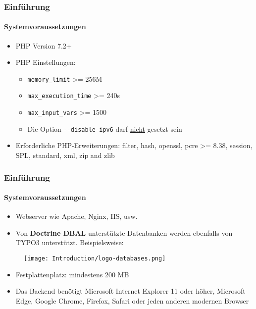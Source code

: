 \begin{frame}[fragile]
	\frametitle{Einführung}
	\framesubtitle{Systemvoraussetzungen}

	\begin{itemize}
		\item PHP Version 7.2+
		\item PHP Einstellungen:

			\begin{itemize}
				\item \texttt{memory\_limit} >= 256M
				\item \texttt{max\_execution\_time} >= 240s
				\item \texttt{max\_input\_vars} >= 1500
				\item Die Option \texttt{-}\texttt{-disable-ipv6} darf \underline{nicht} gesetzt sein
			\end{itemize}

		\item Erforderliche PHP-Erweiterungen:\newline
			\small
				filter, hash, openssl, pcre >= 8.38, session, SPL, standard,
				xml, zip and zlib
			\normalsize
	\end{itemize}

\end{frame}


\begin{frame}[fragile]
	\frametitle{Einführung}
	\framesubtitle{Systemvoraussetzungen}

	\begin{itemize}
		\item Webserver wie Apache, Nginx, IIS, usw.
		\item Von \textbf{Doctrine DBAL} unterstützte Datenbanken werden ebenfalls
			von TYPO3 unterstützt. Beispielsweise:
	\end{itemize}

	\begin{figure}
		\texttt{[image: Introduction/logo-databases.png]}
	\end{figure}

	\begin{itemize}
		\item Festplattenplatz: mindestens 200 MB
		\item Das Backend benötigt Microsoft Internet Explorer 11 oder höher,
			Microsoft Edge, Google Chrome, Firefox, Safari oder jeden anderen
			modernen Browser
	\end{itemize}

\end{frame}

